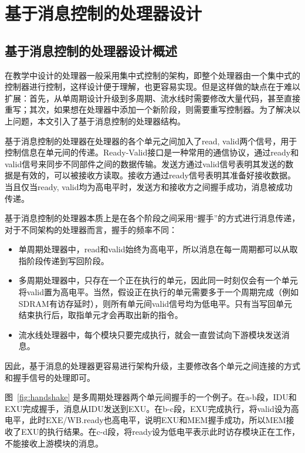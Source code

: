 
\chapter{基于消息控制的处理器设计}

\section{基于消息控制的处理器设计概述}

在教学中设计的处理器一般采用集中式控制的架构\cite{pattersonComputerOrganizationDesign2017}，即整个处理器由一个集中式的控制器进行控制，这样设计便于理解，也更容易实现。但是这样做的缺点在于难以扩展：首先，从单周期设计升级到多周期、流水线时需要修改大量代码，甚至直接重写；其次，如果想在处理器中添加一个新阶段，则需要重写控制器。为了解决以上问题，本文引入了基于消息控制的处理器结构。

基于消息控制的处理器在处理器的各个单元之间加入了read, valid两个信号，用于控制信息在单元间的传递。Ready-Valid接口是一种常用的通信协议，通过ready和valid信号来同步不同部件之间的数据传输。发送方通过valid信号表明其发送的数据是有效的，可以被接收方读取。接收方通过ready信号表明其准备好接收数据。当且仅当ready, valid均为高电平时，发送方和接收方之间握手成功，消息被成功传递。

基于消息控制的处理器本质上是在各个阶段之间采用“握手”的方式进行消息传递，对于不同架构的处理器而言，握手的频率不同：

\begin{itemize}
    \item 单周期处理器中，read和valid始终为高电平，所以消息在每一周期都可以从取指阶段传递到写回阶段。
    \item 多周期处理器中，只存在一个正在执行的单元，因此同一时刻仅会有一个单元将valid置为高电平。当然，假设正在执行的单元需要多于一个周期完成（例如SDRAM有访存延时），则所有单元间valid信号均为低电平。只有当写回单元结束执行后，取指单元才会再取出新的指令。
    \item 流水线处理器中，每个模块只要完成执行，就会一直尝试向下游模块发送消息。
\end{itemize}

因此，基于消息的处理器更容易进行架构升级，主要修改各个单元之间连接的方式和握手信号的处理即可。

图~\ref{fig:handshake} 是多周期处理器两个单元间握手的一个例子。在a-b段，IDU和EXU完成握手，消息从IDU发送到EXU。在b-c段，EXU完成执行，将valid设为高电平，此时EXE/WB.ready也高电平，说明EXU和MEM握手成功，所以MEM接收了EXU的执行结果。在c-d段，将ready设为低电平表示此时访存模块正在工作，不能接收上游模块的消息。

